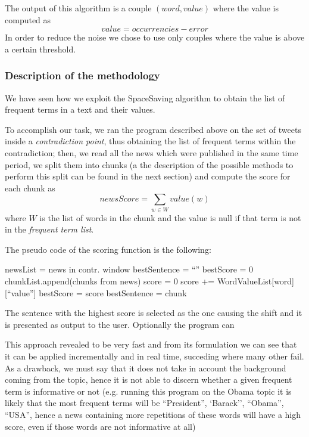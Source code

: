 The output of this algorithm is a couple $(word, value)$ where the value is
computed as 
\begin{displaymath}
	value = occurrencies - error
\end{displaymath}
In order to reduce the noise we chose to use only couples where the value is
above a certain threshold.

\subsubsection*{Description of the methodology}
We have seen how we exploit the SpaceSaving algorithm to obtain the list of
frequent terms in a text and their values. 

To accomplish our task, we ran the program described above on the set of tweets inside a
\emph{contradiction point}, thus obtaining the list of frequent terms within the
contradiction; then, we read all the news which were published in the same time
period, we split them into chunks (a the description of the possible methods to
perform this split can be found in the next section) and compute the score for
each chunk as
\begin{displaymath}
	newsScore = \sum_{w \in W} value(w)
\end{displaymath}
where $W$ is the list of words in the chunk and the value is null if that term is
not in the \emph{frequent term list}.

The pseudo code of the scoring function is the following:
\begin{algorithmic}
\STATE newsList = news in contr. window
\STATE bestSentence = ``''
\STATE bestScore = 0
	\STATE chunkList.append(chunks from news)
\ENDFOR
{}
	\STATE score = 0
			\STATE score += WordValueList[word][``value'']
		\ELSE {}
			\STATE bestScore = score
			\STATE bestSentence = chunk
		\ENDIF \ENDIF
	\ENDFOR
\ENDFOR
\end{algorithmic}
The sentence with the highest score is selected as the one causing the shift and
it is presented as output to the user. Optionally the program can 

This approach revealed to be very fast and from its formulation we can see that
it can be applied incrementally and in real time, succeding where many other fail. As a drawback, we must say that it does not
take in account the background coming from the topic, hence it is not able to
discern whether a given frequent term is informative or not (e.g. running this
program on the Obama topic it is likely that the most
frequent terms will be ``President'', `Barack'', ``Obama'', ``USA'', hence a
news containing more repetitions of these words will have a high score, even if
those words are not informative at all)

